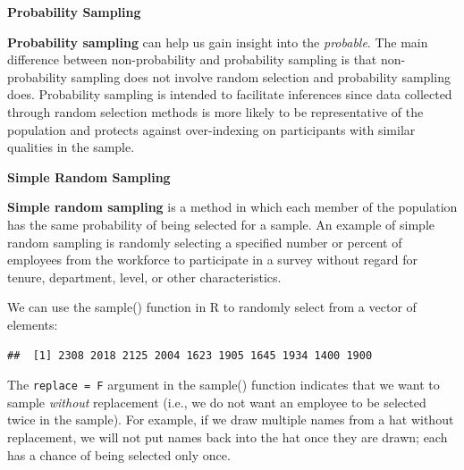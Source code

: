 \documentclass[]{book}
\newenvironment{Shaded}{\begin{snugshade}}{\end{snugshade}}
\newcommand{\CommentTok}[1]{\textcolor[rgb]{0.56,0.35,0.01}{\textit{#1}}}
\newcommand{\DataTypeTok}[1]{\textcolor[rgb]{0.13,0.29,0.53}{#1}}
\newcommand{\DecValTok}[1]{\textcolor[rgb]{0.00,0.00,0.81}{#1}}
\newcommand{\KeywordTok}[1]{\textcolor[rgb]{0.13,0.29,0.53}{\textbf{#1}}}
\newcommand{\NormalTok}[1]{#1}
\newcommand{\OperatorTok}[1]{\textcolor[rgb]{0.81,0.36,0.00}{\textbf{#1}}}
\newcommand{\StringTok}[1]{\textcolor[rgb]{0.31,0.60,0.02}{#1}}
\begin{document}
\textbf{Probability Sampling}

\textbf{Probability sampling} can help us gain insight into the \emph{probable}. The main difference between non-probability and probability sampling is that non-probability sampling does not involve random selection and probability sampling does. Probability sampling is intended to facilitate inferences since data collected through random selection methods is more likely to be representative of the population and protects against over-indexing on participants with similar qualities in the sample.

\textbf{Simple Random Sampling}

\textbf{Simple random sampling} is a method in which each member of the population has the same probability of being selected for a sample. An example of simple random sampling is randomly selecting a specified number or percent of employees from the workforce to participate in a survey without regard for tenure, department, level, or other characteristics.

We can use the sample() function in R to randomly select from a vector of elements:

\begin{Shaded}
\end{Shaded}

\begin{verbatim}
##  [1] 2308 2018 2125 2004 1623 1905 1645 1934 1400 1900
\end{verbatim}

The \texttt{replace\ =\ F} argument in the sample() function indicates that we want to sample \emph{without} replacement (i.e., we do not want an employee to be selected twice in the sample). For example, if we draw multiple names from a hat without replacement, we will not put names back into the hat once they are drawn; each has a chance of being selected only once.
\end{document}
